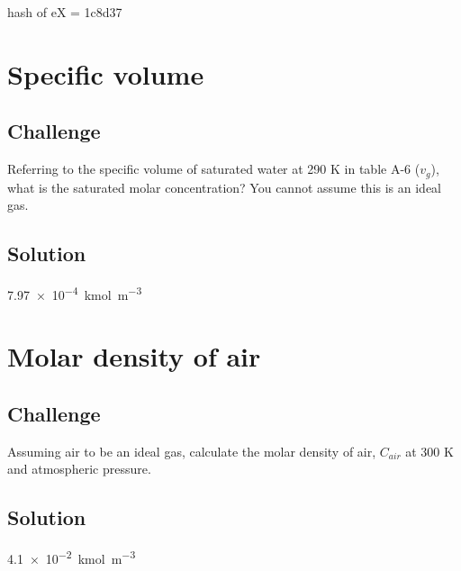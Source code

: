 hash of eX = 1c8d37



\newpage
\section{Specific volume}

\subsection*{Challenge}
Referring to the specific volume of saturated water at 290 K in table A-6 ($v_g$), what is the saturated molar concentration? You cannot assume this is an ideal gas.

\subsection*{Solution}
\SI{7.97e-4}{\kmol\per\cubic\meter}




\newpage
\section{Molar density of air}

\subsection*{Challenge}
Assuming air to be an ideal gas, calculate the molar density of air, $C_{air}$ at 300 K and atmospheric pressure.

\subsection*{Solution}
\SI{4.1e-2}{\kmol\per\cubic\meter}
